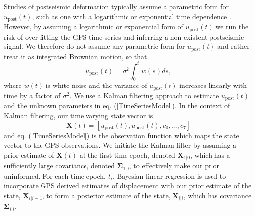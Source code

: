 \documentclass[review]{elsarticle}
\begin{document}
Studies of postseismic deformation typically assume a parametric form for $u_\mathrm{post}(t)$, such as one with a logarithmic or exponential time dependence \citep[e.g.][]{Savage2005a}.  However, by assuming a logarithmic or exponential form of $u_\mathrm{post}(t)$ we run the risk of over fitting the GPS time series and inferring a non-existent postseismic signal. We therefore do not assume any parametric form for $u_\mathrm{post}(t)$ and rather treat it as integrated Brownian motion, so that 
\begin{equation}
    \dot{u}_\mathrm{post}(t) = \sigma^2\int_0^t w(s) ds,
\end{equation}    
where $w(t)$ is white noise and the variance of $\dot{u}_\mathrm{post}(t)$ increases linearly with time by a factor of $\sigma^2$. We use a Kalman filtering approach to estimate $u_\mathrm{post}(t)$ and the unknown parameters in eq. (\ref{TimeSeriesModel}).  In the context of Kalman filtering, our time varying state vector is
\begin{equation}
    \mathbf{X}(t) = [u_\mathrm{post}(t),\dot u_\mathrm{post}(t), c_0, ..., c_7]
\end{equation}
and eq. (\ref{TimeSeriesModel}) is the observation function which maps the state vector to the GPS observations. We initiate the Kalman filter by assuming a prior estimate of $\mathbf{X}(t)$ at the first time epoch, denoted $\mathbf{X}_{1|0}$, which has a sufficiently large covariance, denoted $\mathbf{\Sigma}_{1|0}$, to effectively make our prior uninformed.  For each time epoch, $t_i$, Bayesian linear regression is used to incorporate GPS derived estimates of displacement with our prior estimate of the state, $\mathbf{X}_{i|i-1}$, to form a posterior estimate of the state, $\mathbf{X}_{i|i}$, which has covariance $\mathbf{\Sigma}_{i|i}$.  
\end{document}

